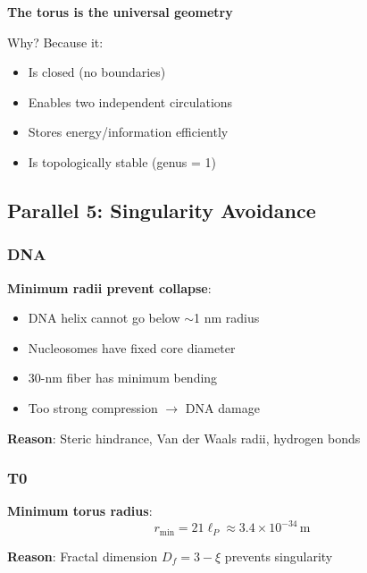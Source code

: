 	\begin{keyresult}
		\textbf{The torus is the universal geometry}
		
		Why? Because it:
		\begin{itemize}
			\item Is closed (no boundaries)
			\item Enables two independent circulations
			\item Stores energy/information efficiently
			\item Is topologically stable (genus = 1)
		\end{itemize}
	\end{keyresult}
	
	\subsection{Parallel 5: Singularity Avoidance}
	
	\subsubsection{DNA}
	
	\textbf{Minimum radii prevent collapse}:
	
	\begin{itemize}
		\item DNA helix cannot go below $\sim$1 nm radius
		\item Nucleosomes have fixed core diameter
		\item 30-nm fiber has minimum bending
		\item Too strong compression $\to$ DNA damage
	\end{itemize}
	
	\textbf{Reason}: Steric hindrance, Van der Waals radii, hydrogen bonds
	
	\subsubsection{T0}
	
	\textbf{Minimum torus radius}:
	\begin{equation}
		r_{\min} = 21\ell_P \approx 3.4 \times 10^{-34}\,\text{m}
	\end{equation}
	
	\textbf{Reason}: Fractal dimension $D_f = 3-\xi$ prevents singularity
	
